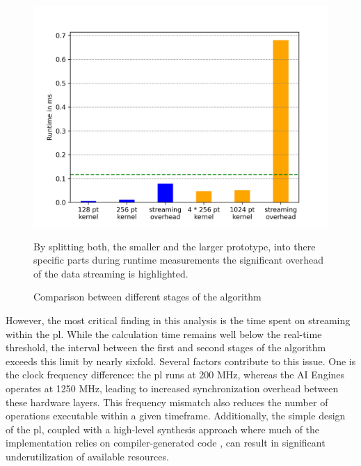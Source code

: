\begin{figure}[h]
    \centering
    \includegraphics[width=0.6\linewidth]{images/part_comp.png}
    \captionsetup{justification=centering}
    \caption{Comparison between different stages of the algorithm}
        By splitting both, the smaller and the larger prototype, into there specific parts during runtime measurements the significant overhead of the data streaming is highlighted.
    \label{fig:part_comp}
\end{figure}

However, the most critical finding in this analysis is the time spent on streaming within the \ac{pl}. While the calculation time remains well below the real-time threshold, the interval between the first and second stages of the algorithm exceeds this limit by nearly sixfold. Several factors contribute to this issue. One is the clock frequency difference: the \ac{pl} runs at 200 MHz, whereas the AI Engines operates at 1250 MHz, leading to increased synchronization overhead between these hardware layers. This frequency mismatch also reduces the number of operations executable within a given timeframe. Additionally, the simple design of the \ac{pl}, coupled with a high-level synthesis approach where much of the implementation relies on compiler-generated code \cite{huang_survey_2020}, can result in significant underutilization of available resources.
